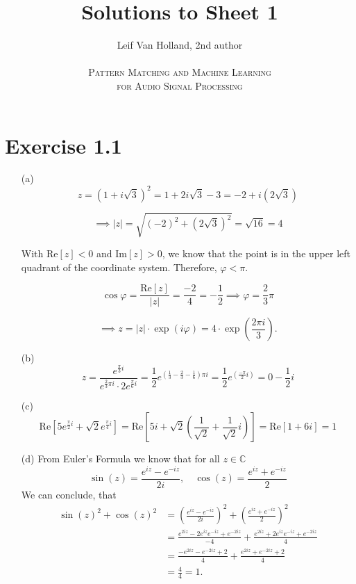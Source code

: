 \documentclass[12pt]{article}
\begin{document}
 
 
\title{Solutions to Sheet 1}
\author{Leif Van Holland, 2nd author \\ \\
\textsc{Pattern Matching and Machine Learning} \\
\textsc{for Audio Signal Processing}}

\maketitle

\section*{Exercise 1.1}
\begin{itemize}
    \item[(a)] \[z = \left(1+i\sqrt{3}\right)^2 = 1+2i\sqrt{3}-3=-2+i(2\sqrt{3})\]
    
     \[\implies |z| = \sqrt{(-2)^2 + (2\sqrt{3})^2} = \sqrt{16} = 4\]
     
     With $\text{Re}[z] < 0$ and $\text{Im}[z] > 0$, we know that the point is in the upper left quadrant of the coordinate system. Therefore, $\varphi < \pi$.
     
     \[\cos \varphi = \frac{\text{Re}[z]}{|z|} = \frac{-2}{4} = -\frac{1}{2} \implies \varphi = \frac{2}{3}\pi\]
     
     \[\implies z = |z|\cdot \exp(i\varphi) = 4\cdot\exp(\frac{2\pi i}{3}).\]
     
     \item[(b)] \[z=\frac{e^{\frac{\pi}{3}i}}{e^{\frac{2}{3}\pi i}\cdot 2e^{\frac{\pi}{6}i}} = \frac{1}{2}e^{(\frac{1}{3}-\frac{2}{3}-\frac{1}{6})\pi i} = \frac{1}{2}e^{(\frac{-\pi}{2}i)} = 0-\frac{1}{2}i\]
     
     \item[(c)] \[\text{Re}\left[5e^{\frac{\pi}{2}i}+\sqrt{2}e^{\frac{\pi}{4}i} \right] = \text{Re}\left[5i + \sqrt{2}(\frac{1}{\sqrt{2}}+\frac{1}{\sqrt{2}}i)\right] = \text{Re}\left[ 1 + 6i \right] = 1\]
     
     \item [(d)] From Euler's Formula we know that for all $z\in\mathbb{C}$
     \[ \sin(z) = \frac{e^{iz}-e^{-iz}}{2i},\quad \cos(z) = \frac{e^{iz}+e^{-iz}}{2} \]
     We can conclude, that
     \begin{align*}
         \sin(z)^2 + \cos(z)^2 &= \left(\frac{e^{iz}-e^{-iz}}{2i}\right)^2 + \left(\frac{e^{iz}+e^{-iz}}{2}\right)^2 \\
         &= \frac{e^{2iz}-2e^{iz}e^{-iz}+e^{-2iz}}{-4} + \frac{e^{2iz}+2e^{iz}e^{-iz}+e^{-2iz}}{4} \\
         &= \frac{-e^{2iz}-e^{-2iz}+2}{4} + \frac{e^{2iz}+e^{-2iz}+2}{4} \\
         &= \frac{4}{4} = 1.
     \end{align*}
     
\end{itemize}
\end{document}
